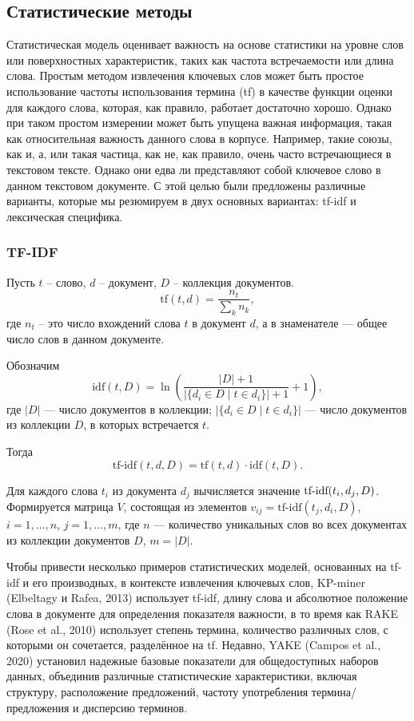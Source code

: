 \documentclass[bachelor, och, diploma ]{SCWorks}
\begin{document}
\subsection{Статистические методы}
Статистическая модель оценивает важность
на основе статистики на уровне слов или поверхностных характеристик,
таких как частота встречаемости или длина слова.
Простым методом извлечения ключевых слов может быть
простое использование частоты использования термина (tf) в качестве функции оценки для каждого слова, которая, как правило, работает достаточно хорошо.
Однако при таком простом измерении может быть упущена важная
информация, такая как относительная важность
данного слова в корпусе. Например,
такие союзы, как и, а, или такая частица, как не, как правило, очень
часто встречающиеся в текстовом тексте. Однако они едва ли представляют собой ключевое слово в данном текстовом документе. С этой
целью были предложены различные варианты, которые
мы резюмируем в двух основных вариантах: tf-idf  и лексическая специфика.

\subsubsection{TF-IDF}

Пусть \( t \) – слово, \( d \) – документ, \( D \) – коллекция документов.
\[
\text{tf}(t,d) = \frac{n_t}{\sum_{k} n_k},
\]
где \( n_t \) – это число вхождений слова \( t \) в документ \( d \), а в знаменателе — общее число слов в данном документе.

Обозначим
\[
\text{idf}(t,D) = \ln \left( \frac{|D| + 1}{|\{d_i \in D \mid t \in d_i\}| + 1} + 1 \right),
\]
где \( |D| \) — число документов в коллекции; \( |\{d_i \in D \mid t \in d_i\}| \) — число документов из коллекции \( D \), в которых встречается \( t \).

Тогда
\[
\text{tf-idf}(t,d,D) = \text{tf}(t,d) \cdot \text{idf}(t,D).
\]

Для каждого слова \( t_i \) из документа \( d_j \) вычисляется значение \( \text{tf-idf}\-(t_i,d_j,D) \). Формируется матрица \( V \), состоящая из элементов \( v_{ij} = \text{tf-idf}(t_j, d_i, D) \), \( i = 1, \ldots, n \), \( j = 1, \ldots, m \), где \( n \) — количество уникальных слов во всех документах из коллекции документов \( D \), \( m = |D| \).

Чтобы привести несколько примеров статистических моделей, основанных на tf-idf и его производных, в контексте извлечения ключевых слов, KP-miner (Elbeltagy и Rafea, 2013) использует tf-idf, длину слова и абсолютное положение слова в документе для определения показателя важности, в то время как RAKE (Rose et al., 2010) использует степень термина, количество различных слов, с которыми он сочетается, разделённое на tf. Недавно, YAKE (Campos et al., 2020) установил надежные базовые показатели для общедоступных наборов данных, объединив различные статистические характеристики, включая структуру, расположение предложений, частоту употребления термина/предложения и дисперсию терминов.
\end{document}
